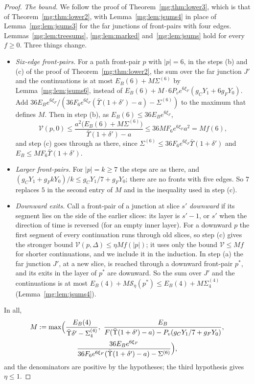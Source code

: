 \documentclass[11pt,a4paper]{article}
\theoremstyle{definition}
\theoremstyle{remark}
\begin{document}
\begin{proof}
\emph{The bound.} We follow the proof of Theorem~\ref{mg:thm:lower3}, which is that of Theorem~\ref{mg:thm:lower2}, with Lemma~\ref{mg:lem:jsums4} in place of
Lemma~\ref{mg:lem:jsums3} for the far junctions of front-pairs with four edges. Lemmas~\ref{mg:lem:treesums}, \ref{mg:lem:marked} and~\ref{mg:lem:jsums} hold for
every $f\ge0$. Three things change.
\begin{itemize}
\item \emph{Six-edge front-pairs.} For a path front-pair $p$ with $|p|=6$, in the steps (b) and (c) of the proof of Theorem~\ref{mg:thm:lower2}, the sum over the far
junction $J'$ and the continuations is at most $E_B(6)+M\Sigma^{(6)}$ by Lemma~\ref{mg:lem:jsums6}, instead of $E_B(6)+M\cdot6P_ve^{6\xi_F}(g_CY_1+6g_FY_0)$. Add
$36E_Be^{6\xi_F}/(36F_6e^{6\xi_F}(\bar\Upsilon(1+\delta')-a)-\Sigma^{(6)})$ to the maximum that defines $M$. Then in step (b), as $E_B(6)\le36E_Be^{6\xi_F}$,
\[
\mathcal V(p,0)\le\frac{a^2\bigl(E_B(6)+M\Sigma^{(6)}\bigr)}{\bar\Upsilon(1+\delta')-a}\le36MF_6e^{6\xi_F}a^2=Mf(6),
\]
and step (c) goes through as there, since $\Sigma^{(6)}\le36F_6e^{6\xi_F}\bar\Upsilon(1+\delta')$ and $E_B\le MF_6\bar\Upsilon(1+\delta')$.
\item \emph{Larger front-pairs.} For $|p|=k\ge7$ the steps are as there, and $(g_CY_1+g_FkY_0)/k\le g_CY_1/7+g_FY_0$; there are no fronts with five edges. So
$7$ replaces $5$ in the second entry of $M$ and in the inequality used in step (c).
\item \emph{Downward exits.} Call a front-pair of a junction at slice $s'$ \emph{downward} if its segment lies on the side of the earlier slices: its layer is $s'-1$,
or $s'$ when the direction of time is reversed (for an empty inner layer). For a downward $p$ the first segment of every continuation runs through old slices, so
step (c) gives the stronger bound $\mathcal V(p,\Delta)\le\eta Mf(|p|)$; it uses only the bound $\mathcal V\le Mf$ for shorter continuations, and we include it in the
induction. In step (a) the far junction $J'$, at a new slice, is reached through a downward front-pair $p^*$, and its exits in the layer of $p^*$ are downward. So the
sum over $J'$ and the continuations is at most $E_B(4)+M\mathcal S_\eta(p^*)\le E_B(4)+M\Sigma^{(4)}_4$ (Lemma~\ref{mg:lem:jsums4}).
\end{itemize}
In all,
\begin{multline*}
M:=\max\Bigl(\frac{E_B(4)}{\bar\Upsilon\delta'-\Sigma^{(4)}_4},\ \frac{E_B}{F(\bar\Upsilon(1+\delta')-a)-P_v(g_CY_1/7+g_FY_0)},\\
\frac{36E_Be^{6\xi_F}}{36F_6e^{6\xi_F}(\bar\Upsilon(1+\delta')-a)-\Sigma^{(6)}}\Bigr),
\end{multline*}
and the denominators are positive by the hypotheses; the third hypothesis gives $\eta\le1$.


\end{proof}
\end{document}
